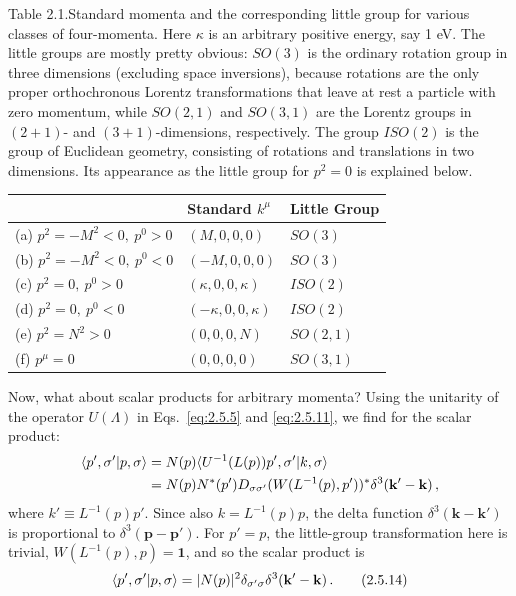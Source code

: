 \begin{center}
\begin{minipage}{0.94\textwidth}
\noindent Table 2.1.\quad Standard momenta and the corresponding little group for various
classes of four-momenta. Here $\kappa$ is an arbitrary positive energy, say
1 eV. The little groups are mostly pretty obvious: $SO(3)$ is the ordinary
rotation group in three dimensions (excluding space inversions), because
rotations are the only proper orthochronous Lorentz transformations that leave
at rest a particle with zero momentum, while $SO(2,1)$ and $SO(3,1)$ are the
Lorentz groups in $(2+1)$- and $(3+1)$-dimensions, respectively. The group
$ISO(2)$ is the group of Euclidean geometry, consisting of rotations and
translations in two dimensions. Its appearance as the little group for
$p^2=0$ is explained below.

\medskip
\centering
\renewcommand{\arraystretch}{1.35}
\begin{tabular}{@{}lll@{}}
\hline\hline
 & Standard $k^\mu$ & Little Group \\
\hline
(a) $p^2=-M^2<0,\ p^0>0$ & $(M,0,0,0)$ & $SO(3)$ \\
(b) $p^2=-M^2<0,\ p^0<0$ & $(-M,0,0,0)$ & $SO(3)$ \\
(c) $p^2=0,\ p^0>0$ & $(\kappa,0,0,\kappa)$ & $ISO(2)$ \\
(d) $p^2=0,\ p^0<0$ & $(-\kappa,0,0,\kappa)$ & $ISO(2)$ \\
(e) $p^2=N^2>0$ & $(0,0,0,N)$ & $SO(2,1)$ \\
(f) $p^\mu=0$ & $(0,0,0,0)$ & $SO(3,1)$ \\
\hline\hline
\end{tabular}
\end{minipage}
\end{center}

Now, what about scalar products for arbitrary momenta? Using the unitarity of
the operator $U(\Lambda)$ in Eqs.~\eqref{eq:2.5.5} and \eqref{eq:2.5.11}, we find for the scalar
product:
\[
\begin{aligned}
\langle p',\sigma' | p,\sigma\rangle
&=N(p)\langle U^{-1}(L(p))p',\sigma' | k,\sigma\rangle\\
&=N(p)N^*(p')
D_{\sigma\sigma'}(W(L^{-1}(p),p'))^*
\delta^3(\mathbf{k}'-\mathbf{k})\,,
\end{aligned}
\]
where $k'\equiv L^{-1}(p)p'$. Since also $k=L^{-1}(p)p$, the delta function
$\delta^3(\mathbf{k}-\mathbf{k}')$ is proportional to
$\delta^3(\mathbf{p}-\mathbf{p}')$. For $p'=p$, the little-group
transformation here is trivial, $W(L^{-1}(p),p)=\mathbf{1}$, and so the scalar product is
\begin{equation}
\langle p',\sigma' | p,\sigma\rangle
=|N(p)|^2\delta_{\sigma'\sigma}
\delta^3(\mathbf{k}'-\mathbf{k})\,.
\tag{2.5.14}\label{eq:2.5.14}
\end{equation}

